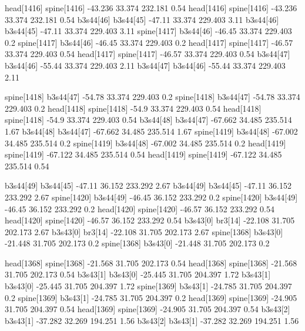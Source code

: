 head[1416]    spine[1416]    -43.236    33.374    232.181    0.54
head[1416]    spine[1416]    -43.236    33.374    232.181    0.54
b3s44[46]    b3s44[45]    -47.11    33.374    229.403    3.11
b3s44[46]    b3s44[45]    -47.11    33.374    229.403    3.11
spine[1417]    b3s44[46]    -46.45    33.374    229.403    0.2
spine[1417]    b3s44[46]    -46.45    33.374    229.403    0.2
head[1417]    spine[1417]    -46.57    33.374    229.403    0.54
head[1417]    spine[1417]    -46.57    33.374    229.403    0.54
b3s44[47]    b3s44[46]    -55.44    33.374    229.403    2.11
b3s44[47]    b3s44[46]    -55.44    33.374    229.403    2.11


spine[1418]    b3s44[47]    -54.78    33.374    229.403    0.2
spine[1418]    b3s44[47]    -54.78    33.374    229.403    0.2
head[1418]    spine[1418]    -54.9    33.374    229.403    0.54
head[1418]    spine[1418]    -54.9    33.374    229.403    0.54
b3s44[48]    b3s44[47]    -67.662    34.485    235.514    1.67
b3s44[48]    b3s44[47]    -67.662    34.485    235.514    1.67
spine[1419]    b3s44[48]    -67.002    34.485    235.514    0.2
spine[1419]    b3s44[48]    -67.002    34.485    235.514    0.2
head[1419]    spine[1419]    -67.122    34.485    235.514    0.54
head[1419]    spine[1419]    -67.122    34.485    235.514    0.54


b3s44[49]    b3s44[45]    -47.11    36.152    233.292    2.67
b3s44[49]    b3s44[45]    -47.11    36.152    233.292    2.67
spine[1420]    b3s44[49]    -46.45    36.152    233.292    0.2
spine[1420]    b3s44[49]    -46.45    36.152    233.292    0.2
head[1420]    spine[1420]    -46.57    36.152    233.292    0.54
head[1420]    spine[1420]    -46.57    36.152    233.292    0.54
b3s43[0]    br3[14]    -22.108    31.705    202.173    2.67
b3s43[0]    br3[14]    -22.108    31.705    202.173    2.67
spine[1368]    b3s43[0]    -21.448    31.705    202.173    0.2
spine[1368]    b3s43[0]    -21.448    31.705    202.173    0.2


head[1368]    spine[1368]    -21.568    31.705    202.173    0.54
head[1368]    spine[1368]    -21.568    31.705    202.173    0.54
b3s43[1]    b3s43[0]    -25.445    31.705    204.397    1.72
b3s43[1]    b3s43[0]    -25.445    31.705    204.397    1.72
spine[1369]    b3s43[1]    -24.785    31.705    204.397    0.2
spine[1369]    b3s43[1]    -24.785    31.705    204.397    0.2
head[1369]    spine[1369]    -24.905    31.705    204.397    0.54
head[1369]    spine[1369]    -24.905    31.705    204.397    0.54
b3s43[2]    b3s43[1]    -37.282    32.269    194.251    1.56
b3s43[2]    b3s43[1]    -37.282    32.269    194.251    1.56



